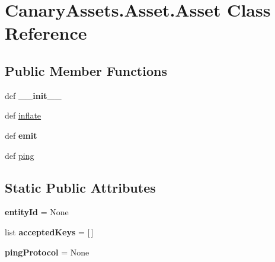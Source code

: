 \hypertarget{class_canary_assets_1_1_asset_1_1_asset}{\section{Canary\-Assets.\-Asset.\-Asset Class Reference}
\label{class_canary_assets_1_1_asset_1_1_asset}
}
\subsection*{Public Member Functions}
\begin{DoxyCompactItemize}
\item 
\hypertarget{class_canary_assets_1_1_asset_1_1_asset_a86ac77042148b8490907c19e59585002}{def {\bfseries \-\_\-\-\_\-init\-\_\-\-\_\-}}\label{class_canary_assets_1_1_asset_1_1_asset_a86ac77042148b8490907c19e59585002}

\item 
def \hyperlink{class_canary_assets_1_1_asset_1_1_asset_a9b0b6f19f09d50dea75071e5c5af494b}{inflate}
\item 
\hypertarget{class_canary_assets_1_1_asset_1_1_asset_acf5d55e86c096f3319b4265d93e0f1c8}{def {\bfseries emit}}\label{class_canary_assets_1_1_asset_1_1_asset_acf5d55e86c096f3319b4265d93e0f1c8}

\item 
def \hyperlink{class_canary_assets_1_1_asset_1_1_asset_ab5655ab09219eb41b0f4b757f3cc339a}{ping}
\end{DoxyCompactItemize}
\subsection*{Static Public Attributes}
\begin{DoxyCompactItemize}
\item 
\hypertarget{class_canary_assets_1_1_asset_1_1_asset_afb1b09475cec8a2a41237a0678d5ec38}{{\bfseries entity\-Id} = None}\label{class_canary_assets_1_1_asset_1_1_asset_afb1b09475cec8a2a41237a0678d5ec38}

\item 
\hypertarget{class_canary_assets_1_1_asset_1_1_asset_ad262abea1621878cbd0b397f0d54356b}{list {\bfseries accepted\-Keys} = \mbox{[}$\,$\mbox{]}}\label{class_canary_assets_1_1_asset_1_1_asset_ad262abea1621878cbd0b397f0d54356b}

\item 
\hypertarget{class_canary_assets_1_1_asset_1_1_asset_ab425107a364d89337e3545ab54a6fc62}{{\bfseries ping\-Protocol} = None}\label{class_canary_assets_1_1_asset_1_1_asset_ab425107a364d89337e3545ab54a6fc62}

\end{DoxyCompactItemize}


